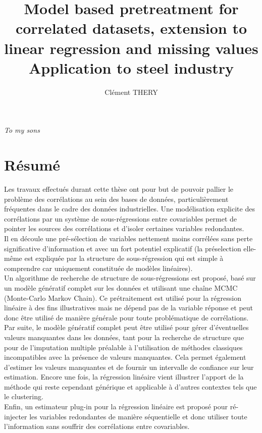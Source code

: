 \documentclass[12pt,a4paper]{report}
\author{Clément THERY}
\title{Model based pretreatment for correlated datasets, extension to linear regression and missing values \\ Application to steel industry}
\begin{document}
\maketitle
\newpage
\itshape To my sons
\upshape


\chapter*{Résumé}
	Les travaux effectués durant cette thèse ont pour but de pouvoir pallier le problème des corrélations au sein des bases de données, particulièrement fréquentes dans le cadre des données industrielles. Une modélisation explicite des corrélations par un système de sous-régressions entre covariables permet de pointer les sources des corrélations et d'isoler certaines variables redondantes. 
	\\
	
	Il en découle une pré-sélection de variables nettement moins corrélées sans perte significative d'information et avec un fort potentiel explicatif (la préselection elle-même est expliquée par la structure de sous-régression qui est simple à comprendre car uniquement constituée de modèles linéaires). \\
	
	Un algorithme de recherche de structure de sous-régressions est proposé, basé sur un modèle génératif complet sur les données et utilisant une chaîne MCMC (Monte-Carlo Markov Chain). Ce prétraitement est utilisé pour la régression linéaire à des fins illustratives mais ne dépend pas de la variable réponse et peut donc être utilisé de manière générale pour toute problématique de corrélations.\\
	
	Par suite, le modèle génératif complet peut être utilisé pour gérer d'éventuelles valeurs manquantes dans les données, tant pour la recherche de structure que pour de l'imputation multiple préalable à l'utilisation de méthodes classiques incompatibles avec la présence de valeurs manquantes. Cela permet également d'estimer les valeurs manquantes et de fournir un intervalle de confiance sur leur estimation.
	Encore une fois, la régression linéaire vient illustrer l'apport de la méthode qui reste cependant générique et applicable à d'autres contextes tels que le clustering.
	\\
	
	Enfin, un estimateur plug-in pour la régression linéaire est proposé pour ré-injecter les variables redondantes de manière séquentielle et donc utiliser toute l'information sans souffrir des corrélations entre covariables.
	\\
	
\end{document}
